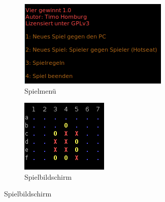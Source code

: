 \documentclass[10pt,a4paper,titlepage]{article}
\begin{document}
\begin{figure}
	\centering
	\begin{subfigure}{.5\textwidth}
		\centering
		\includegraphics[width=0.9\linewidth]{img/menu.png}
		\caption{Spielmenü}
		\label{fig:sub1}
	\end{subfigure}%
	\begin{subfigure}{.5\textwidth}
		\centering
		\includegraphics[width=0.9\linewidth]{img/connectfour.png}
		\caption{Spielbildschirm}
		\label{fig:sub2}
	\end{subfigure}
	\label{fig:test}
\end{figure}
\end{document}
